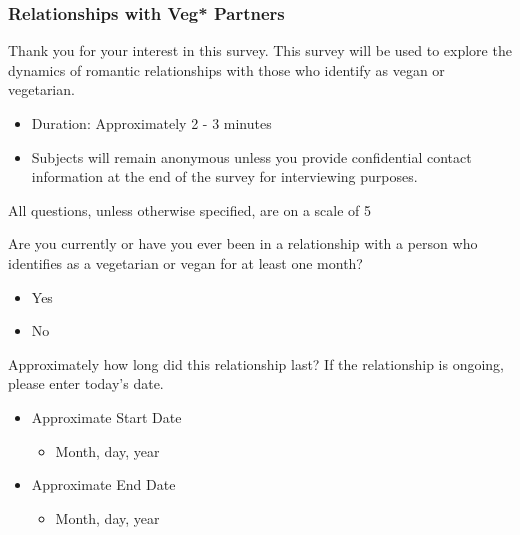 \documentclass[twoside]{report}
\begin{document}
\begin{multicols*}{2}
\begin{multicols}{2}
\subsubsection{Relationships with Veg*
Partners}

Thank you for your interest in this survey. This survey will be used to
explore the dynamics of romantic relationships with those who identify
as vegan or vegetarian.

\begin{itemize}
\item
  Duration: Approximately 2 - 3 minutes
\end{itemize}

\begin{itemize}
\item
  Subjects will remain anonymous unless you provide confidential contact
  information at the end of the survey for interviewing purposes.
\end{itemize}

All questions, unless otherwise specified, are on a scale of 5

Are you currently or have you ever been in a relationship with a person
who identifies as a vegetarian or vegan for at least one month?

\begin{itemize}
\item
  Yes
\end{itemize}

\begin{itemize}
\item
  No
\end{itemize}

Approximately how long did this relationship last? If the relationship
is ongoing, please enter today's date.

\begin{itemize}
\item
  Approximate Start Date

  \begin{itemize}
  \item
    Month, day, year
  \end{itemize}
\end{itemize}

\begin{itemize}
\item
  Approximate End Date

  \begin{itemize}
  \item
    Month, day, year
  \end{itemize}
\end{itemize}


\end{multicols}
\end{multicols*}
\end{document}
